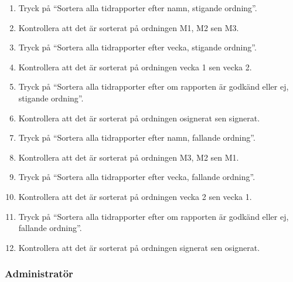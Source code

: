 \documentclass[a4paper]{article}
\begin{document}
\begin{ST}
\begin{enumerate}
\item Tryck på ``Sortera alla tidrapporter efter namn, stigande ordning''.
\item Kontrollera att det är sorterat på ordningen M1, M2 sen M3.
\item Tryck på ``Sortera alla tidrapporter efter vecka, stigande ordning''.
\item Kontrollera att det är sorterat på ordningen vecka 1 sen vecka 2.
\item Tryck på ``Sortera alla tidrapporter efter om rapporten är godkänd eller ej, stigande ordning''.
\item Kontrollera att det är sorterat på ordningen osignerat sen signerat.
\item Tryck på ``Sortera alla tidrapporter efter namn, fallande ordning''.
\item Kontrollera att det är sorterat på ordningen M3, M2 sen M1.
\item Tryck på ``Sortera alla tidrapporter efter vecka, fallande ordning''.
\item Kontrollera att det är sorterat på ordningen vecka 2 sen vecka 1.
\item Tryck på ``Sortera alla tidrapporter efter om rapporten är godkänd eller ej, fallande ordning''.
\item Kontrollera att det är sorterat på ordningen signerat sen osignerat.
\end{enumerate}

\end{ST}

\subsubsection{Administratör}
\end{document}
